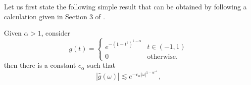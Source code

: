 Let us first state the following simple result that can be obtained by following a calculation given in Section 3 of \cite{johnson2015saddle}. 
\begin{lemma} Given $\alpha>1$, consider
 \begin{equation}\label{alpha-g}
  g(t) = \begin{cases} 
      e^{-(1-t^2)^{1 - \alpha}} & t\in (-1,1) \\
      0 & \text{otherwise}.
   \end{cases}
 \end{equation}
then there is a constant $c_\alpha$ such that
 \begin{equation}\label{eq_181}
  |\hat{g}(\omega )|\lesssim e^{-c_\alpha|\omega |^{1-\alpha^{-1}}},
 \end{equation}
\end{lemma}
